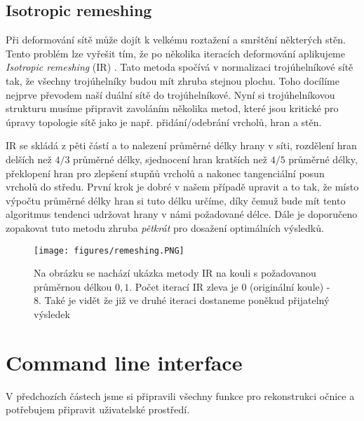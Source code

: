 \subsection{Isotropic remeshing}
Při deformování sítě může dojít k velkému roztažení a smrštění některých stěn. Tento problém lze vyřešit tím, že po několika iteracích deformování aplikujeme \emph{Isotropic remeshing} (IR) \cite{isotropic-remeshing}. Tato metoda spočívá v normalizaci trojúhelníkové sítě tak, že všechny trojúhelníky budou mít zhruba stejnou plochu. Toho docílíme nejprve převodem naší duální sítě do trojúhelníkové. Nyní si trojúhelníkovou strukturu musíme připravit zavoláním několika metod, které jsou kritické pro úpravy topologie sítě jako je např. přidání/odebrání vrcholů, hran a stěn.

IR se skládá z pěti částí a to nalezení průměrné délky hrany v síti, rozdělení hran delších než $4/3$ průměrné délky, sjednocení hran kratších než $4/5$ průměrné délky, překlopení hran pro zlepšení stupňů vrcholů a nakonec tangenciální posun vrcholů do středu. První krok je dobré v našem případě upravit a to tak, že místo výpočtu průměrné délky hran si tuto délku určíme, díky čemuž bude mít tento algoritmus tendenci udržovat hrany v námi požadované délce. Dále je doporučeno zopakovat tuto metodu zhruba \emph{pětkrát} \cite{isotropic-remeshing-2} pro dosažení optimálních výsledků.

\begin{figure}[ht]
	\centering
	\texttt{[image: figures/remeshing.PNG]}
	\caption[Isostropic remeshing na kouli]{Na obrázku se nachází ukázka metody IR na kouli s požadovanou průměrnou délkou $0,1$. Počet iterací IR zleva je 0 (originální koule) - 8. Také je vidět že již ve druhé iteraci dostaneme poněkud přijatelný výsledek}
	\label{remeshing}
\end{figure}

\section{Command line interface}
V předchozích částech jsme si připravili všechny funkce pro rekonstrukci očnice a potřebujem připravit uživatelské prostředí.

